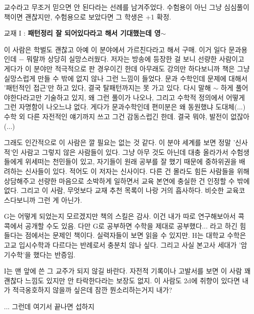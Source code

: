 교수라고 무조거 믿으면 안 된다라는 선례를 남겨주었다.
수험용이 아닌 그냥 심심풀이 책이면 괜찮지만, 수험용으로 보았다면 그 학생은 +1 확정.
\vspace{5mm}

교재 I : \textbf{패턴정리 잘 되어있다라고 해서 기대했는데 영$\sim$}
\vspace{5mm}

이 사람은 학벌도 괜찮고 아예 이 분야에서 가르친다라고 해서 구매. 이거 일다 문과용인데 $-$
뭐랄까 상당히 실망스러웠다. 저자는 방송에 등장한 걸 보니 선량한 사람이고 게다가 이 분야만 적극적으로 판 경우이긴 한데
아무래도 강의만 하다보니까 책은 그냥 실망스럽게 만들 수 밖에 없지 않나 그런 느낌이 들었다.
문과 수학인데 문제에 대해서 '패턴적인 접근'만 하고 있다, 결국 탈패턴까지는 못 가고 있다.
다시 말해 $\sim$ 하게 풀어야한다라고만 기술하고 있지, 왜 그런 풀이가 나오나, 그리고 수학적 정의에서 어떻게 그런 자명함이 나오느냐 없다.
게다가 문과수학인데 편미분은 왜 동원했냐 도대체(...)
수학 외 다른 자전적인 얘기까지 쓰고 그건 감동스럽긴 한데. 결국 뭐야, 발전이 없잖아(...)
\vspace{5mm}

그래도 인간적으로 이 사람은 깔 필요는 없는 것 같다.
이 분야 세계를 보면 정말 '신사적'인 사람고 그렇지 않은 사람들이 있다.
그냥 아무 것도 아닌데 대충 올라가서 수험생들에게 위세떠는 천민들이 있고,
자기들이 원래 공부를 잘 했기 때문에 중하위권을 배려하는 신사들이 있다. 적어도 이 저자는 신사이다.
다른 건 몰라도 힘든 사람들을 위해 상담해주고 선량한 마음으로 소박하게 일하면서 교육 본연에 충실한 건 인정할 수 밖에 없다.
그리고 이 사람, 무엇보다 교재 추천 목록이 나랑 거의 흡사하다. 비슷한 교육코스다보니까 그런 게 아닌가.
\vspace{5mm}

G는 어떻게 되었는지 모르겠지만 책의 스킬은 감사. 이건 내가 따로 연구해보아서 콕콕에서 공개할 수도 있음.
다만 G로 공부하면 수학을 제대로 공부했다... 라고 하긴 힘들다는 점에서는 문제인 책이다. 실력자들이 보면 읽을 수 있지만.
H는 대학교 수학은 고교 입시수학과 다르다는 반례로서 충분치 않나 싶다.
그리고 사실 본고사 세대가 '암기수학'을 했다는 반증임.
\vspace{5mm}

I는 맨 앞에 쓴 그 교주가 되지 않길 바란다.
자전적 기록이나 고발서를 보면 이 사람 꽤 괜찮다 느낌도 있지만 안 타락한다라는 보장도 없지.
이 사람도 2d에 취향이 있다면 내가 적극옹호하지 않을까 싶은데 잠깐 뭔소리하는거지 내가?
\vspace{5mm}

... 그런데 여기서 끝나면 섭하지
\vspace{5mm}


